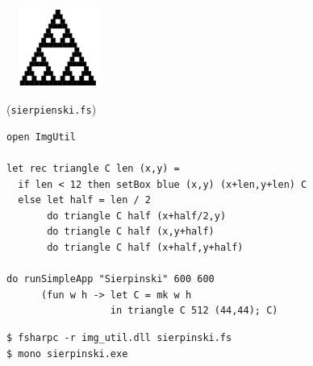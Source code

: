 \documentclass[rgb]{beamer}
\begin{document}
\begin{frame}[fragile]
\begin{footnotesize}

  ~~\hfill\includegraphics[width=0.2\textwidth]{../images/square_triangle.png}

  \vspace{-2.3cm}


  (\texttt{sierpienski.fs})

\begin{lstlisting}[numbers=none,frame=none,mathescape]
open ImgUtil

let rec triangle C len (x,y) =
  if len < 12 then setBox blue (x,y) (x+len,y+len) C
  else let half = len / 2
       do triangle C half (x+half/2,y)
       do triangle C half (x,y+half)
       do triangle C half (x+half,y+half)

do runSimpleApp "Sierpinski" 600 600
      (fun w h -> let C = mk w h
                  in triangle C 512 (44,44); C)
\end{lstlisting}


\begin{verbatim}
$ fsharpc -r img_util.dll sierpinski.fs
$ mono sierpinski.exe
\end{verbatim}

\end{footnotesize}
\end{frame}

\begin{frame}[fragile]
\begin{footnotesize}

  \begin{center}
  \end{center}
\end{footnotesize}
\end{frame}
\end{document}
